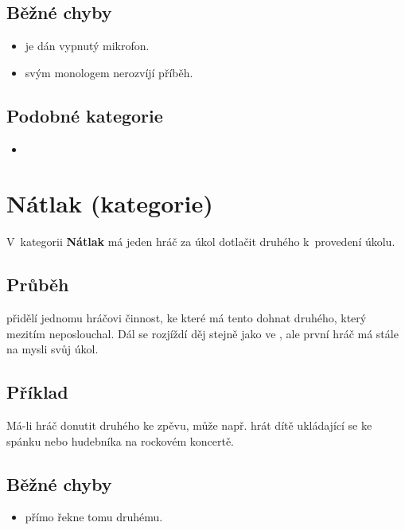 \subsection{ Běžné chyby } \begin{itemize}
\item {} je dán vypnutý mikrofon.
\item {} svým monologem nerozvíjí příběh.
\end{itemize}
 
 
\subsection{ Podobné kategorie } \begin{itemize}
\item {}
\end{itemize}
 
 
 
 
\needspace{5cm} \section{Nátlak (kategorie)} \label{nátlak (kategorie)}  
 
V~kategorii \textbf{Nátlak} má jeden hráč za úkol dotlačit druhého k~provedení úkolu. 
 
\subsection{Průběh}  přidělí jednomu hráčovi činnost, ke které  má tento dohnat druhého, který mezitím neposlouchal. Dál se rozjíždí děj stejně jako ve , ale první hráč má stále na mysli svůj úkol.  
 
\subsection{Příklad} Má-li hráč donutit druhého ke zpěvu, může např. hrát dítě ukládající se ke spánku nebo hudebníka na rockovém koncertě. 
  
\subsection{ Běžné chyby } \begin{itemize}
\item  {}  přímo řekne tomu druhému.
\end{itemize}
 
